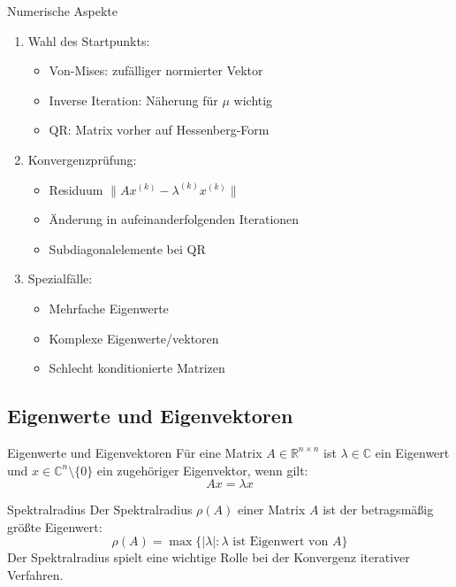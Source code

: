 \begin{KR}{Numerische Aspekte}
\begin{enumerate}
    \item Wahl des Startpunkts:
    \begin{itemize}
        \item Von-Mises: zufälliger normierter Vektor
        \item Inverse Iteration: Näherung für $\mu$ wichtig
        \item QR: Matrix vorher auf Hessenberg-Form
    \end{itemize}
    
    \item Konvergenzprüfung:
    \begin{itemize}
        \item Residuum $\|Ax^{(k)} - \lambda^{(k)}x^{(k)}\|$
        \item Änderung in aufeinanderfolgenden Iterationen
        \item Subdiagonalelemente bei QR
    \end{itemize}
    
    \item Spezialfälle:
    \begin{itemize}
        \item Mehrfache Eigenwerte
        \item Komplexe Eigenwerte/vektoren
        \item Schlecht konditionierte Matrizen
    \end{itemize}
\end{enumerate}
\end{KR}




\subsection{Eigenwerte und Eigenvektoren}

\begin{definition}{Eigenwerte und Eigenvektoren}
Für eine Matrix $A \in \mathbb{R}^{n \times n}$ ist $\lambda \in \mathbb{C}$ ein Eigenwert und $x \in \mathbb{C}^n \setminus \{0\}$ ein zugehöriger Eigenvektor, wenn gilt:
$$Ax = \lambda x$$
\end{definition}

\begin{concept}{Spektralradius}
Der Spektralradius $\rho(A)$ einer Matrix $A$ ist der betragsmäßig größte Eigenwert:
$$\rho(A) = \max\{|\lambda| : \lambda \text{ ist Eigenwert von } A\}$$
Der Spektralradius spielt eine wichtige Rolle bei der Konvergenz iterativer Verfahren.
\end{concept}

